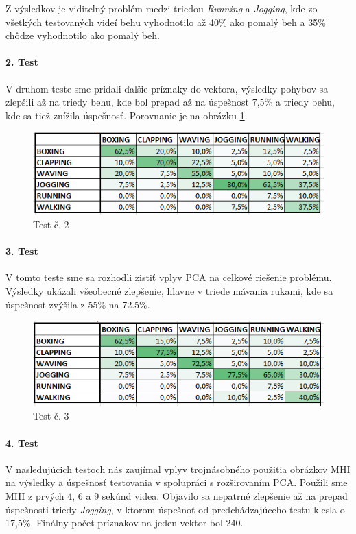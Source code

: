 Z výsledkov je viditeľný problém medzi triedou \textit{Running} a \textit{Jogging}, kde zo všetkých testovaných videí behu vyhodnotilo až 40\% ako pomalý beh a 35\% chôdze vyhodnotilo ako pomalý beh. 


\paragraph{2. Test} 
V druhom teste sme pridali ďalšie príznaky do vektora, výsledky pohybov sa zlepšili až na triedy behu, kde bol prepad až na úspešnosť 7,5\% a triedy behu, kde sa tiež znížila úspešnosť. Porovnanie je na obrázku \ref{test2}.


\begin{figure}[H]
  \centering
  \includegraphics[width=14cm]{img/test6classes11g.png}
  \caption{Test č. 2}
  \label{test2}
\end{figure} 

\paragraph{3. Test} 
V tomto teste sme sa rozhodli zistiť vplyv PCA na celkové riešenie problému. Výsledky ukázali všeobecné zlepšenie, hlavne v triede mávania rukami, kde sa úspešnosť zvýšila z 55\% na 72.5\%.  
\begin{figure}[H]
  \centering
  \includegraphics[width=14cm]{img/test6classes11PCA1g.png}
  \caption{Test č. 3}
  \label{test3}
\end{figure} 


\paragraph{4. Test} 
V nasledujúcich testoch nás zaujímal vplyv trojnásobného použitia obrázkov MHI na výsledky a úspešnosť testovania v spolupráci s rozširovaním PCA. Použili sme MHI z prvých 4, 6 a 9 sekúnd videa. Objavilo sa nepatrné zlepšenie až na prepad úspešnosti triedy \textit{Jogging}, v ktorom úspešnoť od predchádzajúceho testu klesla o 17,5\%. Finálny počet príznakov na jeden vektor bol 240.

